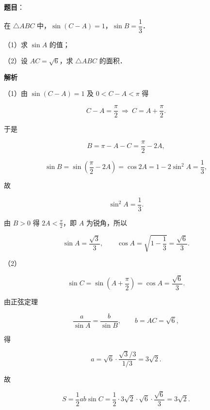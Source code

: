 \begin{answer}

\textbf{题目}：

在 $\triangle ABC$ 中，$\sin(C-A)=1$，$\sin B=\dfrac13$．

（1）求 $\sin A$ 的值；

（2）设 $AC=\sqrt6$，求 $\triangle ABC$ 的面积．

\textbf{解析}

（1）由 $\sin(C-A)=1$ 及 $0<C-A<\pi$ 得

\nopagebreak[4]
\[C-A=\frac\pi2\ \Longrightarrow\ C=A+\frac\pi2 .\]

于是

\nopagebreak[4]
\[B=\pi-A-C=\frac\pi2-2A,\]

\nopagebreak[4]
\[\sin B=\sin\left(\frac\pi2-2A\right)=\cos2A=1-2\sin^2A=\frac13,\]

故

\nopagebreak[4]
\[\sin^2A=\frac13 .\]

由 $B>0$ 得 $2A<\frac\pi2$，即 $A$ 为锐角，所以

\nopagebreak[4]
\[\sin A=\frac{\sqrt3}{3},\qquad \cos A=\sqrt{1-\frac13}=\frac{\sqrt6}{3}.\]

（2）

\nopagebreak[4]
\[\sin C=\sin\left(A+\frac\pi2\right)=\cos A=\frac{\sqrt6}{3}.\]

由正弦定理

\nopagebreak[4]
\[\frac{a}{\sin A}=\frac{b}{\sin B},\qquad b=AC=\sqrt6,\]

得

\nopagebreak[4]
\[a=\sqrt6\cdot\frac{\sqrt3/3}{1/3}=3\sqrt2 .\]

故

\nopagebreak[4]
\[S=\frac12ab\sin C=\frac12\cdot3\sqrt2\cdot\sqrt6\cdot\frac{\sqrt6}{3}=3\sqrt2 .\]


\end{answer}
